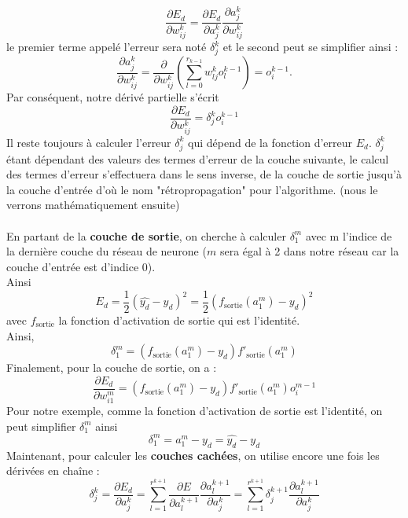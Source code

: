         $$
        \frac{\partial E_d}{\partial w_{ij}^k} = \frac{\partial E_d}{\partial a_{j}^k}\frac{\partial a^k_j}{\partial w_{ij}^k}
        $$
        le premier terme appelé l'erreur sera noté $\delta^k_j$ et le second peut se simplifier ainsi :
        $$
        \frac{\partial a^k_j}{\partial w_{ij}^k} = \frac{\partial}{\partial w_{ij}^k}\left(\sum^{r_{k-1}}_{l=0}w^k_{lj}o^{k-1}_l\right)=o_i^{k-1}
        .$$
        Par conséquent, notre dérivé partielle s'écrit 
        \begin{equation}   
        \frac{\partial E_d}{\partial w_{ij}^k} = \delta^k_jo^{k-1}_i
        \label{eq:formule2}
        \end{equation}
        Il reste toujours à calculer l'erreur $\delta^k_j$ qui dépend de la fonction d'erreur $E_d$. $\delta^k_j$ étant dépendant des valeurs des termes d'erreur de la couche suivante, le calcul des termes d'erreur s'effectuera dans le sens inverse, de la couche de sortie jusqu'à la couche d'entrée d'où le nom "rétropropagation" pour l'algorithme. (nous le verrons mathématiquement ensuite) \\\\
        En partant de la \textbf{couche de sortie}, on cherche à calculer $\delta^m_1$ avec m l'indice de la dernière couche du réseau de neurone ($m$ sera égal à 2 dans notre réseau car la couche d'entrée est d'indice 0). 
        \\Ainsi $$
        E_d = \frac{1}{2}(\hat{y_d}-y_d)^2=\frac{1}{2}(f_{\text{sortie}}(a^m_1)-y_d)^2
        $$
        avec $f_{\text{sortie}}$ la fonction d'activation de sortie qui est l'identité.\\
        Ainsi,
        \begin{equation}
            \delta^m_1 = (f_{\text{sortie}}(a_1^m)-y_d)f'_{\text{sortie}}(a^m_1)
            \label{eq:formule3}
        \end{equation}
        Finalement, pour la couche de sortie, on a :
        $$
        \frac{\partial E_d}{\partial w_{i1}^m} = (f_{\text{sortie}}(a_1^m)-y_d)f'_{\text{sortie}}(a^m_1)o^{m-1}_i
        $$
        Pour notre exemple, comme la fonction d'activation de sortie est l'identité, on peut simplifier $\delta^m_1$ ainsi
        $$\delta^m_1 = a^m_1-y_d = \hat{y_d}-y_d$$
        Maintenant, pour calculer les \textbf{couches cachées}, on utilise encore une fois les dérivées en chaîne : 
        $$
        \delta^k_j = \frac{\partial E_d}{\partial a^k_j} = \sum^{r^{k+1}}_{l=1}\frac{\partial E}{\partial a_l^{k+1}}\frac{\partial a_l^{k+1}}{\partial a_j^{k}}=\sum^{r^{k+1}}_{l=1}\delta^{k+1}_j\frac{\partial a_l^{k+1}}{\partial a_j^{k}}$$
